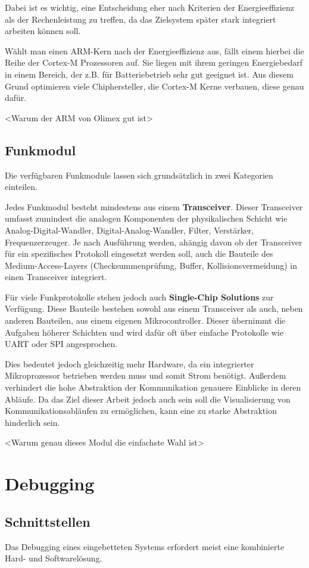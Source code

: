 Dabei ist es wichtig, eine Entscheidung eher nach Kriterien der Energieeffizienz
als der Rechenleistung zu treffen, da das Zielsystem später stark integriert
arbeiten können soll.

Wählt man einen ARM-Kern nach der Energieeffizienz aus, fällt einem hierbei die
Reihe der Cortex-M Prozessoren auf. Sie liegen mit ihrem geringen Energiebedarf
in einem Bereich, der z.B. für Batteriebetrieb sehr gut geeignet ist. Aus diesem
Grund optimieren viele Chiphersteller, die Cortex-M Kerne verbauen, diese genau
dafür.

 <Warum der ARM von Olimex gut ist>

\subsection{Funkmodul} Die verfügbaren Funkmodule lassen sich grundsätzlich in
zwei Kategorien einteilen.

Jedes Funkmodul besteht mindestens aus einem \textbf{Transceiver}. Dieser
Transceiver umfasst zumindest die analogen Komponenten der physikalischen
Schicht wie Analog-Digital-Wandler, Digital-Analog-Wandler, Filter, Verstärker,
Frequenzerzeuger. Je nach Ausführung werden, ahängig davon ob der Transceiver
für ein spezifisches Protokoll eingesetzt werden soll, auch die Bauteile des
Medium-Access-Layers (Checksummenprüfung, Buffer, Kollisionsvermeidung) in
einen Transceiver integriert.

Für viele Funkprotokolle stehen jedoch auch \textbf{Single-Chip Solutions}
zur Verfügung. Diese Bauteile bestehen sowohl aus einem Transceiver als auch,
neben anderen Bauteilen, aus einem eigenen Mikrocontroller. Dieser übernimmt die
Aufgaben höherer Schichten und wird dafür oft über einfache Protokolle wie UART
oder SPI angesprochen.

Dies bedeutet jedoch gleichzeitig mehr Hardware, da ein integrierter
Mikroprozessor betrieben werden muss und somit Strom benötigt.
Außerdem verhindert die hohe Abstraktion der Kommunikation genauere Einblicke in
deren Abläufe. Da das Ziel dieser Arbeit jedoch auch sein soll die
Visualisierung von Kommunikationsabläufen zu ermöglichen, kann eine zu starke
Abstraktion hinderlich sein.


 <Warum genau dieses Modul die einfachste Wahl ist>

\section{Debugging}
\subsection{Schnittstellen}
Das Debugging eines eingebetteten Systems erfordert meist eine kombinierte Hard-
und Softwarelösung.

